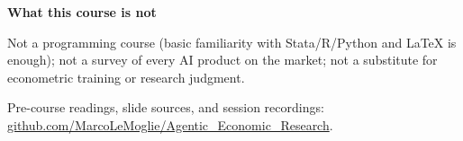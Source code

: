\documentclass[10pt]{article}
\begin{document}
\vspace{0.15em}

\textbf{\color{deepblue}What this course is not}

Not a programming course (basic familiarity with Stata/R/Python and LaTeX is enough);
not a survey of every AI product on the market; not a substitute for econometric
training or research judgment.

\vfill
{\scriptsize\color{muted}
Pre-course readings, slide sources, and session recordings:
\href{https://github.com/MarcoLeMoglie/Agentic_Economic_Research}{github.com/MarcoLeMoglie/Agentic\_Economic\_Research}.
}
\end{document}
